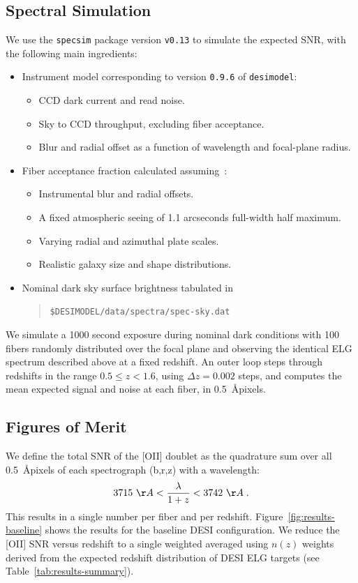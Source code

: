 \documentclass[12pt]{article}
\providecommand{\tab}[1]{Table~\ref{tab:#1}}
\providecommand{\fig}[1]{Figure~\ref{fig:#1}}
\begin{document}
\subsection{Spectral Simulation}

We use the {\tt specsim} package version {\tt v0.13} to simulate the expected SNR, with the following main ingredients:
\begin{itemize}
    \item Instrument model corresponding to version {\tt 0.9.6} of {\tt desimodel}:
    \begin{itemize}
        \item CCD dark current and read noise.
        \item Sky to CCD throughput, excluding fiber acceptance.
        \item Blur and radial offset as a function of wavelength and focal-plane radius.
    \end{itemize}
    \item Fiber acceptance fraction calculated assuming~\cite{desi-2720}:
    \begin{itemize}
        \item Instrumental blur and radial offsets.
        \item A fixed atmospheric seeing of 1.1 arcseconds full-width half maximum.
        \item Varying radial and azimuthal plate scales.
        \item Realistic galaxy size and shape distributions.
    \end{itemize}
    \item Nominal dark sky surface brightness tabulated in
    \begin{quote}
        {\tt \$DESIMODEL/data/spectra/spec-sky.dat}
    \end{quote}
\end{itemize}
We simulate a 1000 second exposure during nominal dark conditions with 100 fibers randomly distributed over the focal plane and observing the identical ELG spectrum
described above at a fixed redshift.  An outer loop steps through redshifts in the range $0.5 \le z < 1.6$, using $\Delta z = 0.002$ steps,
and computes the mean expected signal and noise at each fiber, in 0.5~\AA pixels.

\subsection{Figures of Merit}

We define the total SNR of the [OII] doublet as the quadrature sum over all 0.5~\AA pixels of each spectrograph (b,r,z) with a wavelength:
\begin{equation}
    3715~\AA < \frac{\lambda}{1 + z} < 3742~\AA \; .
\end{equation}
This results in a single number per fiber and per redshift. \fig{results-baseline} shows the results for the baseline DESI configuration.
We reduce the [OII] SNR versus redshift to a single weighted averaged using $n(z)$ weights derived from the expected redshift
distribution of DESI ELG targets (see \tab{results-summary}).
\end{document}
